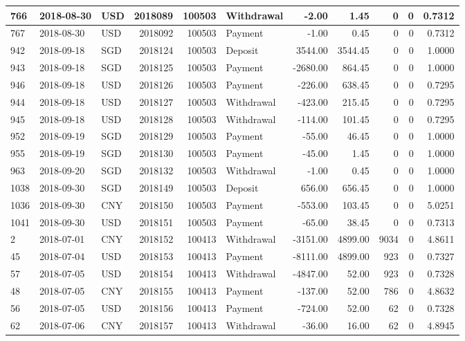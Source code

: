 \documentclass[]{article}
\begin{document}
\begin{table}[H]
\begin{tabular}{l|l|l|r|r|l|r|r|r|r|r}
\hline
766 & 2018-08-30 & USD & 2018089 & 100503 & Withdrawal & -2.00 & 1.45 & 0 & 0 & 0.7312\\
\hline
767 & 2018-08-30 & USD & 2018092 & 100503 & Payment & -1.00 & 0.45 & 0 & 0 & 0.7312\\
\hline
942 & 2018-09-18 & SGD & 2018124 & 100503 & Deposit & 3544.00 & 3544.45 & 0 & 0 & 1.0000\\
\hline
943 & 2018-09-18 & SGD & 2018125 & 100503 & Payment & -2680.00 & 864.45 & 0 & 0 & 1.0000\\
\hline
946 & 2018-09-18 & USD & 2018126 & 100503 & Payment & -226.00 & 638.45 & 0 & 0 & 0.7295\\
\hline
944 & 2018-09-18 & USD & 2018127 & 100503 & Withdrawal & -423.00 & 215.45 & 0 & 0 & 0.7295\\
\hline
945 & 2018-09-18 & USD & 2018128 & 100503 & Withdrawal & -114.00 & 101.45 & 0 & 0 & 0.7295\\
\hline
952 & 2018-09-19 & SGD & 2018129 & 100503 & Payment & -55.00 & 46.45 & 0 & 0 & 1.0000\\
\hline
955 & 2018-09-19 & SGD & 2018130 & 100503 & Payment & -45.00 & 1.45 & 0 & 0 & 1.0000\\
\hline
963 & 2018-09-20 & SGD & 2018132 & 100503 & Withdrawal & -1.00 & 0.45 & 0 & 0 & 1.0000\\
\hline
1038 & 2018-09-30 & SGD & 2018149 & 100503 & Deposit & 656.00 & 656.45 & 0 & 0 & 1.0000\\
\hline
1036 & 2018-09-30 & CNY & 2018150 & 100503 & Payment & -553.00 & 103.45 & 0 & 0 & 5.0251\\
\hline
1041 & 2018-09-30 & USD & 2018151 & 100503 & Payment & -65.00 & 38.45 & 0 & 0 & 0.7313\\
\hline
2 & 2018-07-01 & CNY & 2018152 & 100413 & Withdrawal & -3151.00 & 4899.00 & 9034 & 0 & 4.8611\\
\hline
45 & 2018-07-04 & USD & 2018153 & 100413 & Payment & -8111.00 & 4899.00 & 923 & 0 & 0.7327\\
\hline
57 & 2018-07-05 & USD & 2018154 & 100413 & Withdrawal & -4847.00 & 52.00 & 923 & 0 & 0.7328\\
\hline
48 & 2018-07-05 & CNY & 2018155 & 100413 & Payment & -137.00 & 52.00 & 786 & 0 & 4.8632\\
\hline
56 & 2018-07-05 & USD & 2018156 & 100413 & Payment & -724.00 & 52.00 & 62 & 0 & 0.7328\\
\hline
62 & 2018-07-06 & CNY & 2018157 & 100413 & Withdrawal & -36.00 & 16.00 & 62 & 0 & 4.8945\\

\end{tabular}
\end{table}
\end{document}
